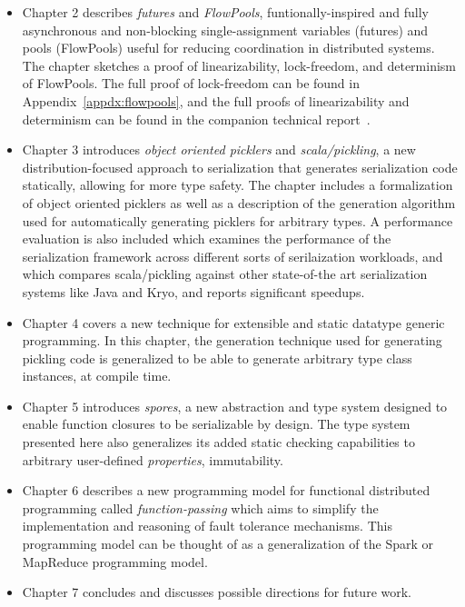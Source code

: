 \begin{itemize}

	\item Chapter 2 describes {\em futures} and {\em FlowPools}, funtionally-inspired
	and fully asynchronous and non-blocking single-assignment variables (futures)
	and pools (FlowPools) useful for reducing coordination in distributed systems.
	The chapter sketches a proof of linearizability, lock-freedom, and determinism
	of FlowPools. The full proof of lock-freedom can be found in
	Appendix~\ref{appdx:flowpools}, and the full proofs of linearizability and
	determinism can be found in the companion technical report~\cite{Prokopec12}.

	\item Chapter 3 introduces {\em object oriented picklers} and {\em
	scala/pickling}, a new distribution-focused approach to serialization that
	generates serialization code statically, allowing for more type safety. The
	chapter includes a formalization of object oriented picklers as well as a
	description of the generation algorithm used for automatically generating
	picklers for arbitrary types. A performance evaluation is also included which
	examines the performance of the serialization framework across different sorts
	of serilaization workloads, and which compares scala/pickling against other
	state-of-the art serialization systems like Java and Kryo, and reports
	significant speedups.

	\item Chapter 4 covers a new technique for extensible and static datatype
	generic programming. In this chapter, the generation technique used for
	generating pickling code is generalized to be able to generate arbitrary type
	class instances, at compile time.

	\item Chapter 5 introduces {\em spores}, a new abstraction and type system
	designed to enable function closures to be serializable by design. The type
	system presented here also generalizes its added static checking capabilities
	to arbitrary user-defined {\em properties}, \eg immutability.

	\item Chapter 6 describes a new programming model for functional distributed
	programming called {\em function-passing} which aims to simplify the
	implementation and reasoning of fault tolerance mechanisms.
  This programming model can be thought of as a generalization of the Spark
	or MapReduce programming model.

	\item Chapter 7 concludes and discusses possible directions for future work.

\end{itemize}

